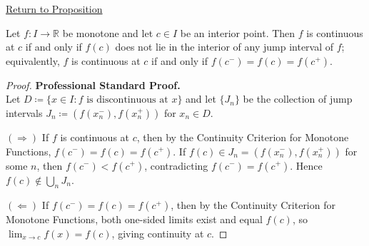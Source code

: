 \newpage
{}
\label{prf:criterion-continuity-monotone}

\begin{remark*}[Return]
\hyperref[prop:criterion-continuity-monotone]{Return to Proposition}
\end{remark*}

\begin{theorem*}
Let $f : I \to \mathbb{R}$ be monotone and let $c \in I$ be an interior point. Then $f$ is continuous at $c$ if and only if $f(c)$ does not lie in the interior of any jump interval of $f$; equivalently, $f$ is continuous at $c$ if and only if $f(c^{-}) = f(c) = f(c^{+})$.
\end{theorem*}

\begin{proof}
\textbf{Professional Standard Proof.}~\\
Let $D \coloneqq \{x \in I : f \text{ is discontinuous at } x\}$ and let $\{J_n\}$ be the collection of jump intervals $J_n \coloneqq (f(x_n^{-}), f(x_n^{+}))$ for $x_n \in D$.

$(\Rightarrow)$ If $f$ is continuous at $c$, then by the Continuity Criterion for Monotone Functions, $f(c^{-}) = f(c) = f(c^{+})$. If $f(c) \in J_n = (f(x_n^{-}), f(x_n^{+}))$ for some $n$, then $f(c^{-}) < f(c^{+})$, contradicting $f(c^{-}) = f(c^{+})$. Hence $f(c) \notin \bigcup_n J_n$.

$(\Leftarrow)$ If $f(c^{-}) = f(c) = f(c^{+})$, then by the Continuity Criterion for Monotone Functions, both one-sided limits exist and equal $f(c)$, so $\lim_{x \to c} f(x) = f(c)$, giving continuity at $c$.
\end{proof}

